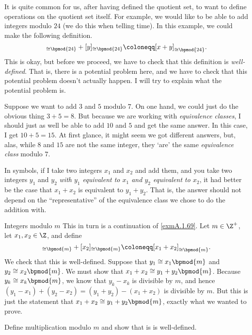 It is quite common for us, after having defined the quotient set, to want to define operations on the quotient set itself.  For example, we would like to be able to add integers modulo $24$ (we do this when telling time).  In this example, we could make the following definition.
\begin{equation}
[x]_{\cong \bpmod{24}}+[y]_{\cong \bpmod{24}}\coloneqq [x+y]_{\cong \bpmod{24}}.
\end{equation}
This is okay, but before we proceed, we have to check that this definition is \emph{well-defined}.  That is, there is a potential problem here, and we have to check that this potential problem doesn't actually happen.  I will try to explain what the potential problem is.

Suppose we want to add $3$ and $5$ modulo $7$.  On one hand, we could just do the obvious thing $3+5=8$.  But because we are working with \emph{equivalence classes}, I should just as well be able to add $10$ and $5$ and get the same answer.  In this case, I get $10+5=15$.  At first glance, it might seem we got different answers, but, alas, while $8$ and $15$ are not the same integer, they `are' the same \emph{equivalence class} modulo $7$.

In symbols, if I take two integers $x_1$ and $x_2$ and add them, and you take two integers $y_1$ and $y_2$ \emph{with $y_1$ equivalent to $x_1$ and $y_2$ equivalent to $x_2$}, it had better be the case that $x_1+x_2$ is equivalent to $y_1+y_2$.  That is, the answer should not depend on the ``representative'' of the equivalence class we chose to do the addition with.
\begin{exm}{Integers modulo $m$}{}
This in turn is a continuation of \cref{exmA.1.69}.  Let $m\in \Z ^+$, let $x_1,x_2\in \Z$, and define
\begin{equation}
[x_1]_{\cong \bpmod{m}}+[x_2]_{\cong \bpmod{m}}\coloneqq [x_1+x_2]_{\cong \bpmod{m}}.
\end{equation}
We check that this is well-defined.  Suppose that $y_1\cong x_1\bpmod{m}$ and $y_2\cong x_2\bpmod{m}$.  We must show that $x_1+x_2\cong y_1+y_2\bpmod{m}$.  Because $y_k\cong x_k\bpmod{m}$, we know that $y_k-x_k$ is divisible by $m$, and hence $(y_1-x_1)+(y_2-x_2)=(y_1+y_2)-(x_1+x_2)$ is divisible by $m$.  But this is just the statement that $x_1+x_2\cong y_1+y_2\bpmod{m}$, exactly what we wanted to prove.
\begin{exr}[breakable=false]{}{}
Define multiplication modulo $m$ and show that is is well-defined.
\end{exr}
\end{exm}

